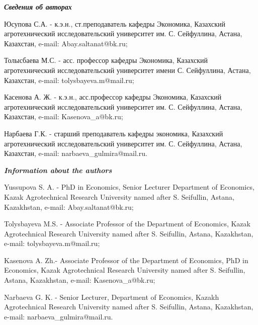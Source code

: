 \begin{authorinfo}
\emph{{\bfseries Сведения об авторах}}

Юсупова С.А. - к.э.н., ст.преподаватель кафедры Экономика, Казахский
агротехнический исследовательский университет им. С. Сейфуллина, Астана,
Казахстан, e-mail: Abay.saltanat@bk.ru;

Толысбаева М.С. - асс. профессор кафедры Экономика, Казахский
агротехнический исследовательский университет имени С. Сейфуллина,
Астана, Казахстан, e-mail: tolysbayeva.m@mail.ru;

Касенова А. Ж. - к.э.н., асс.профессор кафедры Экономика, Казахский
агротехнический исследовательский университет им. С. Сейфуллина, Астана,
Казахстан, e-mail: Kasenova\_a@bk.ru;

Нарбаева Г.К. - старший преподаватель кафедры экономика, Казахский
агротехнический исследовательский университет им. С. Сейфуллина, Астана,
Казахстан, e-mail: narbaeva\_gulmira@mail.ru.

\emph{{\bfseries Information about the authors}}

Yussupova S. A. - PhD in Economics, Senior Lecturer Department of
Economics, Kazak Agrotechnical Research University named after S.
Seifullin, Astana, Kazakhstan, e-mail: Abay.saltanat@bk.ru;

Tolysbayeva M.S. - Associate Professor of the Department of Economics,
Kazak Agrotechnical Research University named after S. Seifullin,
Astana, Kazakhstan, e-mail: tolysbayeva.m@mail.ru;

Kasenova A. Zh.- Associate Professor of the Department of Economics, PhD
in Economics, Kazak Agrotechnical Research University named after S.
Seifullin, Astana, Kazakhstan, e-mail: Kasenova\_a@bk.ru;

Narbaeva G. K. - Senior Lecturer, Department of Economics, Kazakh
Agrotechnical Research University named after S. Seifullin, Astana,
Kazakhstan, e-mail: narbaeva\_gulmira@mail.ru.
\end{authorinfo}
